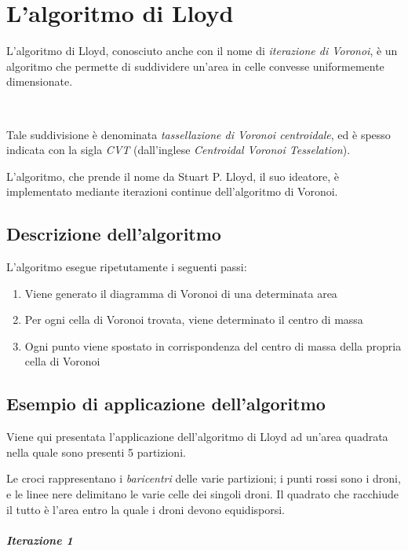 \documentclass[11pt,a4paper]{report}
\begin{document}
\chapter{L'algoritmo di Lloyd}

L'algoritmo di Lloyd, conosciuto anche con il nome di \textit{iterazione di Voronoi}, è un algoritmo che permette di suddividere un'area in celle convesse uniformemente dimensionate. 

\

Tale suddivisione è denominata \textit{tassellazione di Voronoi centroidale}, ed è spesso indicata con la sigla \textit{CVT} (dall'inglese \textit{Centroidal Voronoi Tesselation}).

L'algoritmo, che prende il nome da Stuart P. Lloyd, il suo ideatore, è implementato mediante iterazioni continue dell'algoritmo di Voronoi.

\section{Descrizione dell'algoritmo}

L'algoritmo esegue ripetutamente i seguenti passi:

\begin{enumerate}
	\item Viene generato il diagramma di Voronoi di una determinata area
	\item Per ogni cella di Voronoi trovata, viene determinato il centro di massa
	\item Ogni punto viene spostato in corrispondenza del centro di massa della propria cella di Voronoi
\end{enumerate}

\section{Esempio di applicazione dell'algoritmo}

Viene qui presentata l'applicazione dell'algoritmo di Lloyd ad un'area quadrata nella quale sono presenti 5 partizioni.

Le croci rappresentano i \textit{baricentri} delle varie partizioni; i punti rossi sono i droni, e le linee nere delimitano le varie celle dei singoli droni. Il quadrato che racchiude il tutto è l'area entro la quale i droni devono equidisporsi.

\paragraph{Iterazione 1}
\end{document}
